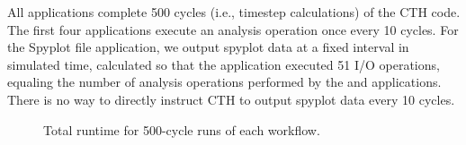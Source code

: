 All applications complete 500 cycles (i.e., timestep calculations) of the
CTH code. The first four applications execute an analysis operation once
every 10 cycles.  For the Spyplot file application, we output spyplot data
at a fixed interval in simulated time, calculated so that the application
executed 51 I/O operations, equaling the number of analysis operations
performed by the \insitu and \intransit applications.  There is no way to
directly instruct CTH to output spyplot data every 10 cycles.

\begin{figure}[p]
\begin{centering}
\vspace{-6pt}

\vspace{-6pt}

\vspace{-6pt}
\caption[Total runtime.]{Total runtime for 500-cycle runs of each
  workflow.}
\label{fig:runtime-individual}
\end{centering}
\end{figure}


